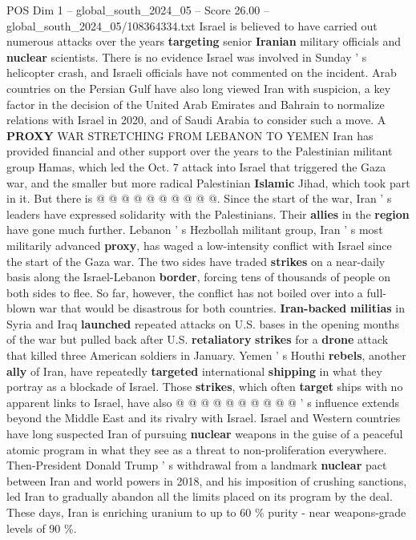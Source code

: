 \begin{textsample}{POS Dim 1 – global\_south\_2024\_05 – Score 26.00 – global\_south\_2024\_05/108364334.txt}
Israel is believed to have carried out numerous attacks over the years \textbf{targeting} senior \textbf{Iranian} military officials and \textbf{nuclear} scientists.
There is no evidence Israel was involved in Sunday ' s helicopter crash, and Israeli officials have not commented on the incident.
Arab countries on the Persian Gulf have also long viewed Iran with suspicion, a key factor in the decision of the United Arab Emirates and Bahrain to normalize relations with Israel in 2020, and of Saudi Arabia to consider such a move.
A \textbf{PROXY} WAR STRETCHING FROM LEBANON TO YEMEN Iran has provided financial and other support over the years to the Palestinian militant group Hamas, which led the Oct. 7 attack into Israel that triggered the Gaza war, and the smaller but more radical Palestinian \textbf{Islamic} Jihad, which took part in it.
But there is @ @ @ @ @ @ @ @ @ @.
Since the start of the war, Iran ' s leaders have expressed solidarity with the Palestinians.
Their \textbf{allies} in the \textbf{region} have gone much further.
Lebanon ' s Hezbollah militant group, Iran ' s most militarily advanced \textbf{proxy}, has waged a low-intensity conflict with Israel since the start of the Gaza war.
The two sides have traded \textbf{strikes} on a near-daily basis along the Israel-Lebanon \textbf{border}, forcing tens of thousands of people on both sides to flee.
So far, however, the conflict has not boiled over into a full-blown war that would be disastrous for both countries. \textbf{Iran-backed} \textbf{militias} in Syria and Iraq \textbf{launched} repeated attacks on U.S. bases in the opening months of the war but pulled back after U.S. \textbf{retaliatory} \textbf{strikes} for a \textbf{drone} attack that killed three American soldiers in January.
Yemen ' s Houthi \textbf{rebels}, another \textbf{ally} of Iran, have repeatedly \textbf{targeted} international \textbf{shipping} in what they portray as a blockade of Israel.
Those \textbf{strikes}, which often \textbf{target} ships with no apparent links to Israel, have also @ @ @ @ @ @ @ @ @ @ ' s influence extends beyond the Middle East and its rivalry with Israel.
Israel and Western countries have long suspected Iran of pursuing \textbf{nuclear} weapons in the guise of a peaceful atomic program in what they see as a threat to non-proliferation everywhere.
Then-President Donald Trump ' s withdrawal from a landmark \textbf{nuclear} pact between Iran and world powers in 2018, and his imposition of crushing sanctions, led Iran to gradually abandon all the limits placed on its program by the deal.
These days, Iran is enriching uranium to up to 60 \% purity - near weapons-grade levels of 90 \%.

\end{textsample}
